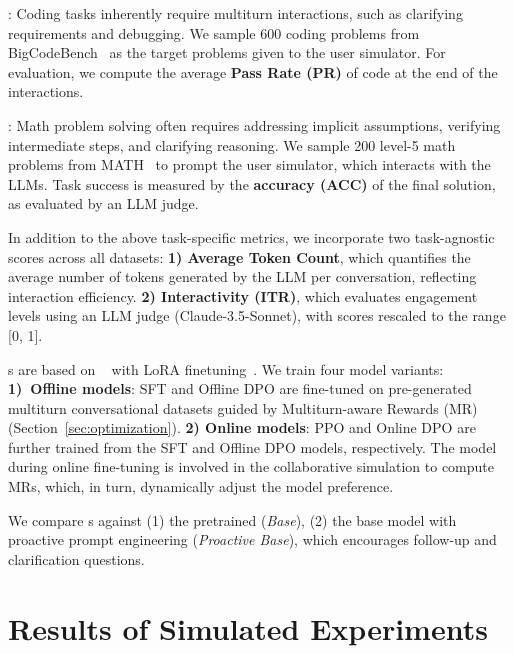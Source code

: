 \noindent \textbf{\codet}: Coding tasks inherently require multiturn interactions, such as clarifying requirements and debugging. We sample 600 coding problems from BigCodeBench~\citep{bigcodebench} as the target problems given to the user simulator. For evaluation, we compute the average \textbf{Pass Rate (PR)} of code at the end of the interactions.

\noindent \textbf{\mathct}: Math problem solving often requires addressing implicit assumptions, verifying intermediate steps, and clarifying reasoning. We sample 200 level-5 math problems from MATH~\citep{math} to prompt the user simulator, which interacts with the LLMs. Task success is measured by the \textbf{accuracy (ACC)} of the final solution, as evaluated by an LLM judge.

    

In addition to the above task-specific metrics, we incorporate two task-agnostic scores across all datasets: \textbf{1) Average Token Count}, which quantifies the average number of tokens generated by the LLM per conversation, reflecting interaction efficiency. \textbf{2) Interactivity (ITR)}, which evaluates engagement levels using an LLM judge (Claude-3.5-Sonnet), with scores rescaled to the range [0, 1]. 






  \name{}s are based on \llama{}~\citep{metallama} with LoRA finetuning~\citep{lora}. We train four model variants: \textbf{1)~Offline models}: SFT and Offline DPO are fine-tuned on pre-generated multiturn conversational datasets guided by Multiturn-aware Rewards (MR) (\cf Section~\ref{sec:optimization}). \textbf{2) Online models}: PPO and Online DPO are further trained from the SFT and Offline DPO models, respectively. The model during online fine-tuning is involved in the collaborative simulation to compute MRs, which, in turn, dynamically adjust the model preference. 


 We compare \name{}s against (1) the pretrained \llama (\textit{Base}), (2) the base model with proactive prompt engineering (\textit{Proactive Base}), which encourages follow-up and clarification questions. 







\section{Results of Simulated Experiments}
\label{sec:quantitative}

